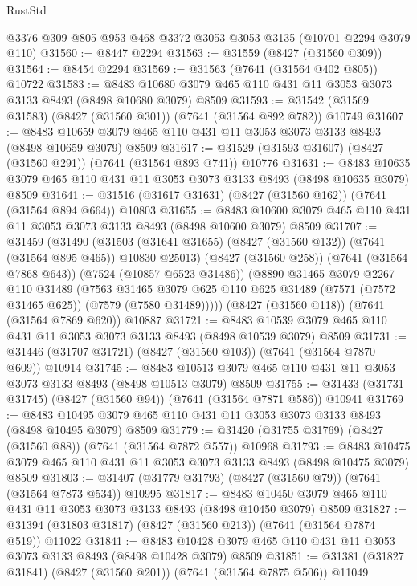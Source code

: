 \begin{lexlean}{RustStd}
\begin{coremodule}
    @3376
    @309
    @805
    @953
    @468
    @3372
    @3053
    @3053
    @3135
    (@10701 @2294 @3079 @110)
@31560 := @8447 @2294
@31563 := @31559 (@8427 (@31560 @309))
@31564 := @8454 @2294
@31569 := @31563 (@7641 (@31564 @402 @805)) @10722
@31583 := @8483 @10680 @3079 @465 @110 @431 @11 @3053 @3073 @3133 @8493 (@8498 @10680 @3079) @8509
@31593 := @31542 (@31569 @31583) (@8427 (@31560 @301)) (@7641 (@31564 @892 @782)) @10749
@31607 := @8483 @10659 @3079 @465 @110 @431 @11 @3053 @3073 @3133 @8493 (@8498 @10659 @3079) @8509
@31617 := @31529 (@31593 @31607) (@8427 (@31560 @291)) (@7641 (@31564 @893 @741)) @10776
@31631 := @8483 @10635 @3079 @465 @110 @431 @11 @3053 @3073 @3133 @8493 (@8498 @10635 @3079) @8509
@31641 := @31516 (@31617 @31631) (@8427 (@31560 @162)) (@7641 (@31564 @894 @664)) @10803
@31655 := @8483 @10600 @3079 @465 @110 @431 @11 @3053 @3073 @3133 @8493 (@8498 @10600 @3079) @8509
@31707 := @31459
    (@31490
      (@31503 (@31641 @31655) (@8427 (@31560 @132)) (@7641 (@31564 @895 @465)) @10830 @25013)
      (@8427 (@31560 @258))
      (@7641 (@31564 @7868 @643))
      (@7524 (@10857 @6523 @31486))
      (@8890
        @31465
        @3079
        @2267
        @110
        @31489
        (@7563
          @31465
          @3079
          @625
          @110
          @625
          @31489
          (@7571 (@7572 @31465 @625))
          (@7579 (@7580 @31489)))))
    (@8427 (@31560 @118))
    (@7641 (@31564 @7869 @620))
    @10887
@31721 := @8483 @10539 @3079 @465 @110 @431 @11 @3053 @3073 @3133 @8493 (@8498 @10539 @3079) @8509
@31731 := @31446 (@31707 @31721) (@8427 (@31560 @103)) (@7641 (@31564 @7870 @609)) @10914
@31745 := @8483 @10513 @3079 @465 @110 @431 @11 @3053 @3073 @3133 @8493 (@8498 @10513 @3079) @8509
@31755 := @31433 (@31731 @31745) (@8427 (@31560 @94)) (@7641 (@31564 @7871 @586)) @10941
@31769 := @8483 @10495 @3079 @465 @110 @431 @11 @3053 @3073 @3133 @8493 (@8498 @10495 @3079) @8509
@31779 := @31420 (@31755 @31769) (@8427 (@31560 @88)) (@7641 (@31564 @7872 @557)) @10968
@31793 := @8483 @10475 @3079 @465 @110 @431 @11 @3053 @3073 @3133 @8493 (@8498 @10475 @3079) @8509
@31803 := @31407 (@31779 @31793) (@8427 (@31560 @79)) (@7641 (@31564 @7873 @534)) @10995
@31817 := @8483 @10450 @3079 @465 @110 @431 @11 @3053 @3073 @3133 @8493 (@8498 @10450 @3079) @8509
@31827 := @31394 (@31803 @31817) (@8427 (@31560 @213)) (@7641 (@31564 @7874 @519)) @11022
@31841 := @8483 @10428 @3079 @465 @110 @431 @11 @3053 @3073 @3133 @8493 (@8498 @10428 @3079) @8509
@31851 := @31381 (@31827 @31841) (@8427 (@31560 @201)) (@7641 (@31564 @7875 @506)) @11049

\end{coremodule}
\end{lexlean}
